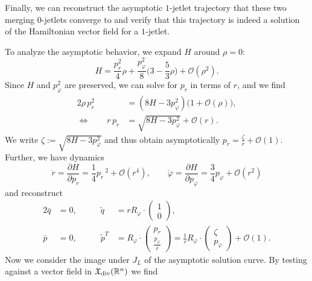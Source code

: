 \documentclass[12pt]{amsart}
\newcommand{\R}{\ensuremath{\mathbb{R}}}
\begin{document}
Finally, we can reconstruct the asymptotic $1$-jetlet trajectory that
these two merging $0$-jetlets converge to and verify that this
trajectory is indeed a solution of the Hamiltonian vector field for a
$1$-jetlet.

To analyze the asymptotic behavior, we expand $H$ around $\rho = 0$:
\begin{equation}
  H = \frac{p_r^2      }{4} \rho
     +\frac{p_\varphi^2}{8}\big(3 - \frac{5}{3}\rho\big)
     +\mathcal{O}(\rho^2).
\end{equation}
Since $H$ and $p_\varphi^2$ are preserved, we can solve for $p_r$ in
terms of $r$, and we find
\begin{align*}
  2\rho\,p_r^2 &= (8H - 3 p_\varphi^2) \big(1 + \mathcal{O}(\rho)\big), \\
\Longleftrightarrow \qquad
      r\,p_r   &= \sqrt{8H - 3 p_\varphi^2} + \mathcal{O}(r).
\end{align*}
We write $\zeta := \sqrt{8H - 3 p_\varphi^2}$ and thus obtain
asymptotically $p_r = \frac{\zeta}{r} + \mathcal{O}(1)$. Further, we
have dynamics
\begin{equation}
  \dot{r} = \frac{\partial H}{\partial p_r} = \frac{1}{4}p_r\,^2 + \mathcal{O}(r^4), \qquad
  \dot{\varphi} = \frac{\partial H}{\partial p_\varphi}
                 = \frac{3}{4}p_\varphi + \mathcal{O}(r^2)
\end{equation}
and reconstruct
\begin{alignat*}{2}
  \bar{q}   &= 0,& \qquad
  \tilde{q} &= r R_\varphi \cdot\begin{pmatrix} 1 \\ 0 \end{pmatrix},\\
  \bar{p}   &= 0,& \qquad
\tilde{p}^T &= R_\varphi \cdot
               \begin{pmatrix} p_r \\ \frac{p_\varphi}{r} \end{pmatrix}
             = \frac{1}{r} R_\varphi \cdot
               \begin{pmatrix} \zeta \\ p_\varphi \end{pmatrix} + \mathcal{O}(1).
\end{alignat*}
Now we consider the image under $J_L$ of the asymptotic solution
curve. By testing against a vector field in $\mathfrak{X}_{\rm
  div}(\R^n)$ we find
\end{document}
